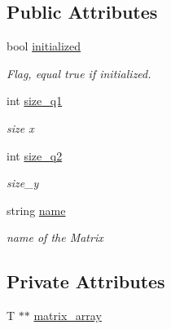 \subsection*{Public Attributes}
\begin{DoxyCompactItemize}
\item 
\hypertarget{class_matrix2_d_acd8fc17999f1ac046a457373dcdf018e}{}bool \hyperlink{class_matrix2_d_acd8fc17999f1ac046a457373dcdf018e}{initialized}\label{class_matrix2_d_acd8fc17999f1ac046a457373dcdf018e}

\begin{DoxyCompactList}\small\item\em Flag, equal true if initialized. \end{DoxyCompactList}\item 
\hypertarget{class_matrix2_d_aa0f54dbae7f59acd18606277b03f505e}{}int \hyperlink{class_matrix2_d_aa0f54dbae7f59acd18606277b03f505e}{size\+\_\+q1}\label{class_matrix2_d_aa0f54dbae7f59acd18606277b03f505e}

\begin{DoxyCompactList}\small\item\em size x \end{DoxyCompactList}\item 
\hypertarget{class_matrix2_d_af6b3e94e8b47cbfcd7cb90ca25cca1ac}{}int \hyperlink{class_matrix2_d_af6b3e94e8b47cbfcd7cb90ca25cca1ac}{size\+\_\+q2}\label{class_matrix2_d_af6b3e94e8b47cbfcd7cb90ca25cca1ac}

\begin{DoxyCompactList}\small\item\em size\+\_\+y \end{DoxyCompactList}\item 
\hypertarget{class_matrix2_d_adbb2532f522c7fb08e1eea5dd31f6392}{}string \hyperlink{class_matrix2_d_adbb2532f522c7fb08e1eea5dd31f6392}{name}\label{class_matrix2_d_adbb2532f522c7fb08e1eea5dd31f6392}

\begin{DoxyCompactList}\small\item\em name of the Matrix \end{DoxyCompactList}\end{DoxyCompactItemize}
\subsection*{Private Attributes}
\begin{DoxyCompactItemize}
\item 
T $\ast$$\ast$ \hyperlink{class_matrix2_d_acb9613c54d199662979a7ab376e4acce}{matrix\+\_\+array}
\end{DoxyCompactItemize}


